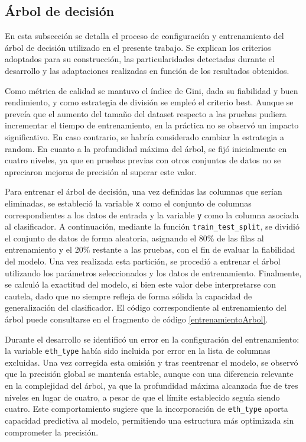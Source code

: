 \subsection{Árbol de decisión}

En esta subsección se detalla el proceso de configuración y entrenamiento del árbol de decisión utilizado en el presente trabajo. Se explican los criterios adoptados para su construcción, las particularidades detectadas durante el desarrollo y las adaptaciones realizadas en función de los resultados obtenidos.

Como métrica de calidad se mantuvo el índice de Gini, dada su fiabilidad y buen rendimiento, y como estrategia de división se empleó el criterio best. Aunque se preveía que el aumento del tamaño del dataset respecto a las pruebas pudiera incrementar el tiempo de entrenamiento, en la práctica no se observó un impacto significativo. En caso contrario, se habría considerado cambiar la estrategia a random. En cuanto a la profundidad máxima del árbol, se fijó inicialmente en cuatro niveles, ya que en pruebas previas con otros conjuntos de datos no se apreciaron mejoras de precisión al superar este valor.

Para entrenar el árbol de decisión, una vez definidas las columnas que serían eliminadas, se estableció la variable \verb|x| como el conjunto de columnas correspondientes a los datos de entrada y la variable \verb|y| como la columna asociada al clasificador. A continuación, mediante la función \verb|train_test_split|, se dividió el conjunto de datos de forma aleatoria, asignando el 80\% de las filas al entrenamiento y el 20\% restante a las pruebas, con el fin de evaluar la fiabilidad del modelo. Una vez realizada esta partición, se procedió a entrenar el árbol utilizando los parámetros seleccionados y los datos de entrenamiento. Finalmente, se calculó la exactitud del modelo, si bien este valor debe interpretarse con cautela, dado que no siempre refleja de forma sólida la capacidad de generalización del clasificador. El código correspondiente al entrenamiento del árbol puede consultarse en el fragmento de código \ref{entrenamientoArbol}.

Durante el desarrollo se identificó un error en la configuración del entrenamiento: la variable \verb|eth_type| había sido incluida por error en la lista de columnas excluidas. Una vez corregida esta omisión y tras reentrenar el modelo, se observó que la precisión global se mantenía estable, aunque con una diferencia relevante en la complejidad del árbol, ya que la profundidad máxima alcanzada fue de tres niveles en lugar de cuatro, a pesar de que el límite establecido seguía siendo cuatro. Este comportamiento sugiere que la incorporación de \verb|eth_type| aporta capacidad predictiva al modelo, permitiendo una estructura más optimizada sin comprometer la precisión.

